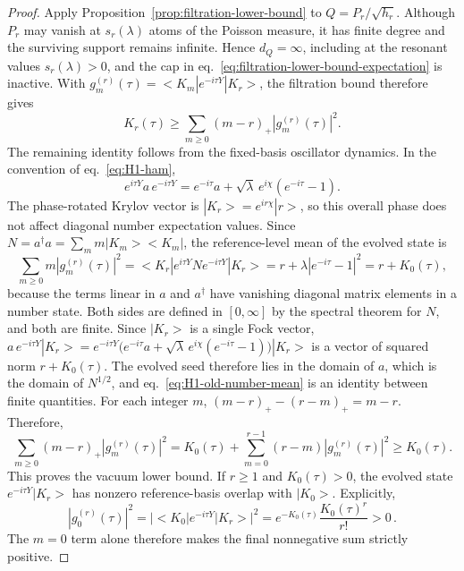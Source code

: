 \documentclass[a4paper,11pt]{article}
\def\ket#1{|#1>}%
\def\bra#1{<#1|}%
\def\ii{i}%
\def\ee{e}%
\theoremstyle{definition}
\theoremstyle{remark}
\newcommand{\ket}[1]{|#1\rangle}
\newcommand{\bra}[1]{\langle #1|}
\newcommand{\ii}{\mathrm i}
\newcommand{\ee}{\mathrm e}
\begin{document}
\begin{proof}
Apply Proposition~\ref{prop:filtration-lower-bound} to
\(Q=P_r/\sqrt{h_r}\).
Although \(P_r\) may vanish at \(s_r(\lambda)\) atoms of the
Poisson measure, it has finite degree and the surviving support remains
infinite. Hence \(d_Q=\infty\), including at the resonant values
\(s_r(\lambda)>0\), and the cap in
eq.~\eqref{eq:filtration-lower-bound-expectation} is inactive.
With
\(g_m^{(r)}(\tau)=
\bra{K_m}\ee^{-\ii\tau Y}\ket{K_r}\),
the filtration bound therefore gives
\begin{equation}
   K_r(\tau)\ge
   \sum_{m\ge0}(m-r)_+|g_m^{(r)}(\tau)|^2.
\end{equation}
The remaining identity follows from the fixed-basis oscillator dynamics. In the convention of eq.~\eqref{eq:H1-ham},
\begin{equation}
   \ee^{\ii\tau Y}a\,\ee^{-\ii\tau Y}
   =
   \ee^{-\ii\tau}a
   +\sqrt{\lambda}\,\ee^{\ii\chi}(\ee^{-\ii\tau}-1).
\end{equation}
The phase-rotated Krylov vector is \(\ket{K_r}=\ee^{\ii r\chi}\ket r\), so this overall phase does not affect diagonal number expectation values.  Since \(N=a^\dagger a=\sum_m m\ket{K_m}\bra{K_m}\), the reference-level mean of the evolved state is
\begin{equation}
   \sum_{m\ge0}m|g_m^{(r)}(\tau)|^2
   =
   \bra{K_r}\ee^{\ii\tau Y}N\ee^{-\ii\tau Y}\ket{K_r}
   =
   r+\lambda|\ee^{-\ii\tau}-1|^2
   =
   r+K_0(\tau),
   \label{eq:H1-old-number-mean}
\end{equation}
because the terms linear in \(a\) and \(a^\dagger\) have vanishing diagonal matrix elements in a number state. Both sides are defined in \([0,\infty]\) by the spectral theorem for \(N\), and both are finite. Since \(\ket{K_r}\) is a single Fock vector, \(a\,\ee^{-\ii\tau Y}\ket{K_r}=\ee^{-\ii\tau Y}\bigl(\ee^{-\ii\tau}a+\sqrt{\lambda}\,\ee^{\ii\chi}(\ee^{-\ii\tau}-1)\bigr)\ket{K_r}\) is a vector of squared norm \(r+K_0(\tau)\). The evolved seed therefore lies in the domain of \(a\), which is the domain of \(N^{1/2}\), and eq.~\eqref{eq:H1-old-number-mean} is an identity between finite quantities.  For each integer \(m\), \((m-r)_+-(r-m)_+=m-r\).  Therefore, 
\begin{equation}
   \sum_{m\ge0}(m-r)_+|g_m^{(r)}(\tau)|^2
   =
   K_0(\tau)+
   \sum_{m=0}^{r-1}(r-m)|g_m^{(r)}(\tau)|^2
   \ge K_0(\tau).
\end{equation}
This proves the vacuum lower bound. If \(r\ge1\) and \(K_0(\tau)>0\), the evolved state \(\ee^{-\ii\tau Y}\ket{K_r}\) has nonzero reference-basis overlap with \(\ket{K_0}\). Explicitly,
\begin{equation}
   |g_0^{(r)}(\tau)|^2
   =
   |\bra{K_0}\ee^{-\ii\tau Y}\ket{K_r}|^2
   =
   \ee^{-K_0(\tau)}\frac{K_0(\tau)^r}{r!}>0\,.
\end{equation}
The \(m=0\) term alone therefore makes the final nonnegative sum strictly positive.
\end{proof}
\end{document}
